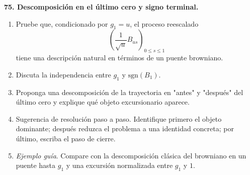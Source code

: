 \documentclass[11pt, letterpaper]{article}
\begin{document}
\begin{ejercicio}
    \textbf{75. Descomposición en el último cero y signo terminal.}
    \begin{enumerate}
        \item Pruebe que, condicionado por $g_{1}=u$, el proceso reescalado
        \[ \left(\frac{1}{\sqrt{u}}B_{us}\right)_{0\le s\le 1} \]
        tiene una descripción natural en términos de un puente browniano.
        \item Discuta la independencia entre $g_{1}$ y $\text{sgn}(B_{1})$.
        \item Proponga una descomposición de la trayectoria en "antes" y "después" del último cero y explique qué objeto excursionario aparece.
        \item Sugerencia de resolución paso a paso. Identifique primero el objeto dominante; después reduzca el problema a una identidad concreta; por último, escriba el paso de cierre.
        \item \textit{Ejemplo guía}. Compare con la descomposición clásica del browniano en un puente hasta $g_{1}$ y una excursión normalizada entre $g_{1}$ y $1$.
    \end{enumerate}
\end{ejercicio}

\vspace{5mm}
\end{document}
